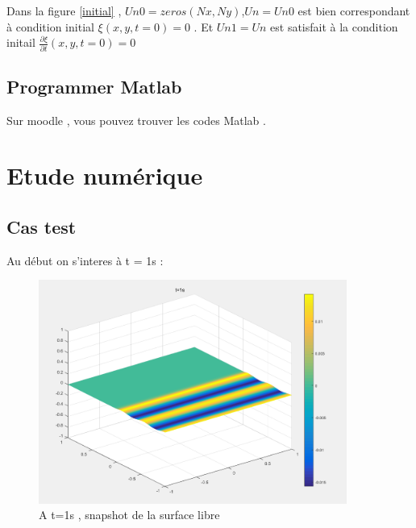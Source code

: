 \documentclass[a4paper,10pt]{report} %
\begin{document}
Dans la figure \ref{initial} , $Un0=zeros(Nx,Ny)$,$Un=Un0$ est bien correspondant à condition initial $\xi(x,y,t=0)=0$ . Et $Un1=Un$ est satisfait à la condition initail $\frac{\partial \xi}{\partial t}(x,y,t=0)=0$
\section{Programmer Matlab}
Sur moodle , vous pouvez trouver les codes Matlab .
\chapter{Etude numérique}
\section{Cas test}

Au début on s'interes à t = 1s :
\begin{figure}[h]
\centering
\includegraphics[width=0.9\textwidth]{fig/figure5.png}
\caption{A t=1s , snapshot de la surface libre}
\label{5}
\end{figure}
\end{document}
